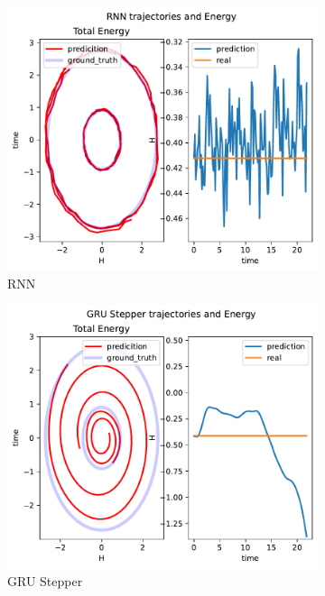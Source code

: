 \begin{figure}[H]
	\begin{subfigure}[b]{0.3\textwidth}
		\centering
		\includegraphics[width=\textwidth]{chapters/chapter5/body2_rnn_traj.pdf}
		\caption{RNN}
	\end{subfigure}
	\hfill
	\begin{subfigure}[b]{0.3\textwidth}
		\centering
		\includegraphics[width=\textwidth]{chapters/chapter5/body2_gre_traj.pdf}
		\caption{GRU Stepper}
	\end{subfigure}
	\hfill
	\begin{subfigure}[b]{0.3\textwidth}

\end{subfigure}
\end{figure}
